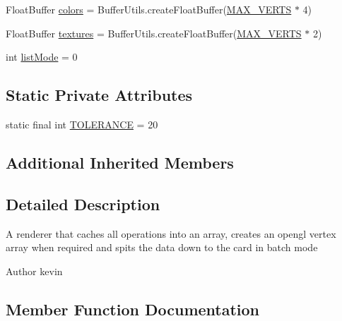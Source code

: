 \begin{DoxyCompactItemize}
\item 
Float\+Buffer \mbox{\hyperlink{classorg_1_1newdawn_1_1slick_1_1opengl_1_1renderer_1_1_v_a_o_g_l_renderer_a3b6b7d9432d2fc78f3e0e46795bf07ee}{colors}} = Buffer\+Utils.\+create\+Float\+Buffer(\mbox{\hyperlink{classorg_1_1newdawn_1_1slick_1_1opengl_1_1renderer_1_1_v_a_o_g_l_renderer_ada536ce7ada01eb56efbcb3e883c2b3f}{M\+A\+X\+\_\+\+V\+E\+R\+TS}} $\ast$ 4)
\item 
Float\+Buffer \mbox{\hyperlink{classorg_1_1newdawn_1_1slick_1_1opengl_1_1renderer_1_1_v_a_o_g_l_renderer_abc2f7f319368eaced023b014dd3ab0f6}{textures}} = Buffer\+Utils.\+create\+Float\+Buffer(\mbox{\hyperlink{classorg_1_1newdawn_1_1slick_1_1opengl_1_1renderer_1_1_v_a_o_g_l_renderer_ada536ce7ada01eb56efbcb3e883c2b3f}{M\+A\+X\+\_\+\+V\+E\+R\+TS}} $\ast$ 2)
\item 
int \mbox{\hyperlink{classorg_1_1newdawn_1_1slick_1_1opengl_1_1renderer_1_1_v_a_o_g_l_renderer_afee8361b229cada04ad11d9ee44c7284}{list\+Mode}} = 0
\end{DoxyCompactItemize}
\subsection*{Static Private Attributes}
\begin{DoxyCompactItemize}
\item 
static final int \mbox{\hyperlink{classorg_1_1newdawn_1_1slick_1_1opengl_1_1renderer_1_1_v_a_o_g_l_renderer_abb76e200ebf6aa690b55cac8f15df89c}{T\+O\+L\+E\+R\+A\+N\+CE}} = 20
\end{DoxyCompactItemize}
\subsection*{Additional Inherited Members}


\subsection{Detailed Description}
A renderer that caches all operations into an array, creates an opengl vertex array when required and spits the data down to the card in batch mode

\begin{DoxyAuthor}{Author}
kevin 
\end{DoxyAuthor}


\subsection{Member Function Documentation}
\mbox{\label{classorg_1_1newdawn_1_1slick_1_1opengl_1_1renderer_1_1_v_a_o_g_l_renderer_a7c5d09419cd40761be8f849631aebab5}} 
